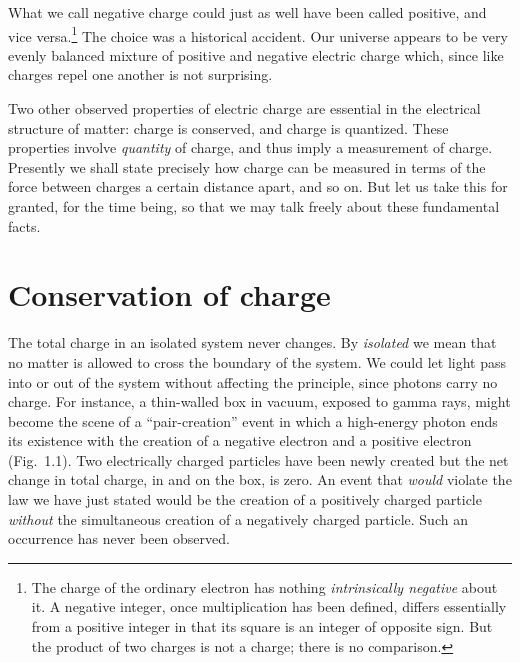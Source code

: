 What we call negative charge could just as well have been
called positive, and vice versa.\footnote{The charge of the ordinary electron has nothing
\emph{intrinsically negative} about it. A negative integer, once multiplication has been
defined, differs essentially from a positive integer in that its square is an integer of
opposite sign. But the product of two charges is not a charge; there is no comparison.}
The choice was a historical accident. Our
universe appears to be very evenly balanced mixture of positive and negative
electric charge which, since like charges repel one another is not surprising. 

Two other observed properties of electric charge are
essential in the electrical structure of matter: charge is conserved, and
charge is quantized. These properties involve \emph{quantity} of charge, and
thus imply a measurement of charge. Presently we shall state precisely how
charge can be measured in terms of the force between charges a certain distance
apart, and so on. But let us take this for granted, for the time being, so that
we may talk freely about these fundamental facts. 

\section{Conservation of charge}

The total charge in an isolated system never changes. By
\emph{isolated} we mean that no matter is allowed to cross the boundary of the
system. We could let light pass into or out of the system without affecting the
principle, since photons carry no charge. For instance, a thin-walled box in
vacuum, exposed to gamma rays, might become the scene of a ``pair-creation''
event in which a high-energy photon ends its existence with the creation of a
negative electron and a positive electron (Fig.~1.1). Two electrically charged
particles have been newly created but the net change in total charge, in and on
the box, is zero. An event that \emph{would} violate the law we have just
stated would be the creation of a positively charged particle \emph{without}
the simultaneous creation of a negatively charged particle. Such an occurrence
has never been observed. 

